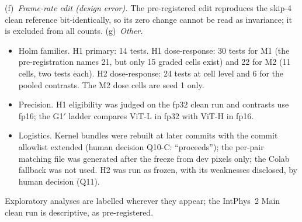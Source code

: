 (f)~\emph{Frame-rate edit (design error).} The pre-registered edit reproduces the skip-4 clean reference bit-identically, so its zero change cannot be read as invariance; it is excluded from all counts.
(g)~\emph{Other.}
\begin{itemize}
\item Holm families. H1 primary: 14 tests. H1 dose-response: 30 tests for M1 (the pre-registration names 21, but only 15 graded cells exist) and 22 for M2 (11 cells, two tests each). H2 dose-response: 24 tests at cell level and 6 for the pooled contrasts. The M2 dose cells are seed 1 only.
\item Precision. H1 eligibility was judged on the fp32 clean run and contrasts use fp16; the G1$'$ ladder compares ViT-L in fp32 with ViT-H in fp16.
\item Logistics. Kernel bundles were rebuilt at later commits with the commit allowlist extended (human decision Q10-C: ``proceeds''); the per-pair matching file was generated after the freeze from dev pixels only; the Colab fallback was not used. H2 was run as frozen, with its weaknesses disclosed, by human decision (Q11).
\end{itemize}
Exploratory analyses are labelled wherever they appear; the IntPhys~2 Main clean run is descriptive, as pre-registered.
